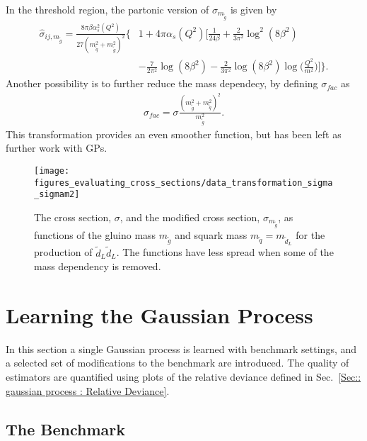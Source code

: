 \documentclass[twoside,english]{uiofysmaster}
\begin{document}
In the threshold region, the partonic version of $\sigma_{m_{\tilde{g}}}$ is given by
\begin{align}
\hat{\sigma}_{ij, m_{\tilde{g}}} =  \frac{8 \pi \beta \alpha^2_s (Q^2)}{27(m_{\tilde{q}}^2 + m_{\tilde{g}}^2)^2} \Bigg\{&1 
 + 4 \pi \alpha_s (Q^2) \Bigg[ \frac{1}{24 \beta} 
 + \frac{2}{3 \pi^2} \log^2(8 \beta^2) \nonumber \\& - \frac{7}{2 \pi^2} \log (8 \beta^2)
- \frac{2}{3 \pi^2} \log (8 \beta^2) \log \Big( \frac{Q^2}{m^2} \Big) \Bigg] \Bigg\}.
\end{align}
Another possibility is to further reduce the mass dependecy, by defining $\sigma_{fac}$ as 
\begin{align}
\sigma_{fac} = \sigma \frac{(m_{\tilde{g}}^2 + m_{\tilde{q}}^2)^2}{m_{\tilde{g}}^2}.
\end{align}
This transformation provides an even smoother function, but has been left as further work with GPs.

\begin{figure}
\centering
\texttt{[image: figures\_evaluating\_cross\_sections/data\_transformation\_sigma\_sigmam2]}
\caption{The cross section, $\sigma$, and the modified cross section, $\sigma_{m_{\tilde{g}}}$,  as functions of the gluino mass $m_{\tilde{g}}$ and squark mass $m_{\tilde{q}} = m_{\tilde{d}_L}$ for the production of $\tilde{d}_L \tilde{d}_L$. The functions have less spread when some of the mass dependency is removed.}
\label{Fig:: evaluating cross : Comparison sigma and sigma/m}
\end{figure}

\section{Learning the Gaussian Process}

In this section a single Gaussian process is learned with benchmark settings, and a selected set of modifications to the benchmark are introduced. The quality of estimators are quantified using plots of the relative deviance defined in Sec.~\ref{Sec:: gaussian process : Relative Deviance}.

\subsection{The Benchmark}\label{Sec:: evaluating cross : The Benchmark}
\end{document}
